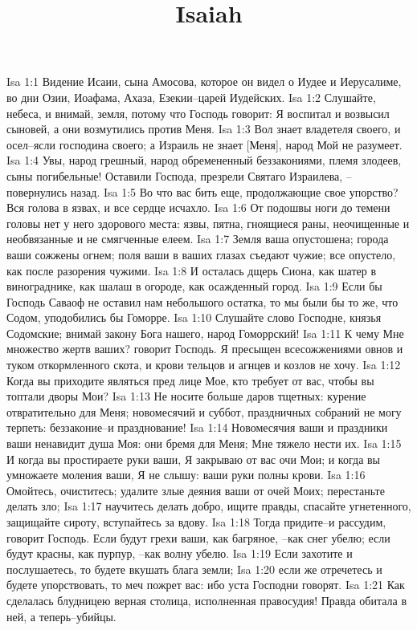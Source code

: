 

\title{Isaiah}

Isa 1:1  Видение Исаии, сына Амосова, которое он видел о Иудее и Иерусалиме, во дни Озии, Иоафама, Ахаза, Езекии--царей Иудейских.
Isa 1:2  Слушайте, небеса, и внимай, земля, потому что Господь говорит: Я воспитал и возвысил сыновей, а они возмутились против Меня.
Isa 1:3  Вол знает владетеля своего, и осел--ясли господина своего; а Израиль не знает [Меня], народ Мой не разумеет.
Isa 1:4  Увы, народ грешный, народ обремененный беззакониями, племя злодеев, сыны погибельные! Оставили Господа, презрели Святаго Израилева, --повернулись назад.
Isa 1:5  Во что вас бить еще, продолжающие свое упорство? Вся голова в язвах, и все сердце исчахло.
Isa 1:6  От подошвы ноги до темени головы нет у него здорового места: язвы, пятна, гноящиеся раны, неочищенные и необвязанные и не смягченные елеем.
Isa 1:7  Земля ваша опустошена; города ваши сожжены огнем; поля ваши в ваших глазах съедают чужие; все опустело, как после разорения чужими.
Isa 1:8  И осталась дщерь Сиона, как шатер в винограднике, как шалаш в огороде, как осажденный город.
Isa 1:9  Если бы Господь Саваоф не оставил нам небольшого остатка, то мы были бы то же, что Содом, уподобились бы Гоморре.
Isa 1:10  Слушайте слово Господне, князья Содомские; внимай закону Бога нашего, народ Гоморрский!
Isa 1:11  К чему Мне множество жертв ваших? говорит Господь. Я пресыщен всесожжениями овнов и туком откормленного скота, и крови тельцов и агнцев и козлов не хочу.
Isa 1:12  Когда вы приходите являться пред лице Мое, кто требует от вас, чтобы вы топтали дворы Мои?
Isa 1:13  Не носите больше даров тщетных: курение отвратительно для Меня; новомесячий и суббот, праздничных собраний не могу терпеть: беззаконие--и празднование!
Isa 1:14  Новомесячия ваши и праздники ваши ненавидит душа Моя: они бремя для Меня; Мне тяжело нести их.
Isa 1:15  И когда вы простираете руки ваши, Я закрываю от вас очи Мои; и когда вы умножаете моления ваши, Я не слышу: ваши руки полны крови.
Isa 1:16  Омойтесь, очиститесь; удалите злые деяния ваши от очей Моих; перестаньте делать зло;
Isa 1:17  научитесь делать добро, ищите правды, спасайте угнетенного, защищайте сироту, вступайтесь за вдову.
Isa 1:18  Тогда придите--и рассудим, говорит Господь. Если будут грехи ваши, как багряное, --как снег убелю; если будут красны, как пурпур, --как волну убелю.
Isa 1:19  Если захотите и послушаетесь, то будете вкушать блага земли;
Isa 1:20  если же отречетесь и будете упорствовать, то меч пожрет вас: ибо уста Господни говорят.
Isa 1:21  Как сделалась блудницею верная столица, исполненная правосудия! Правда обитала в ней, а теперь--убийцы.
